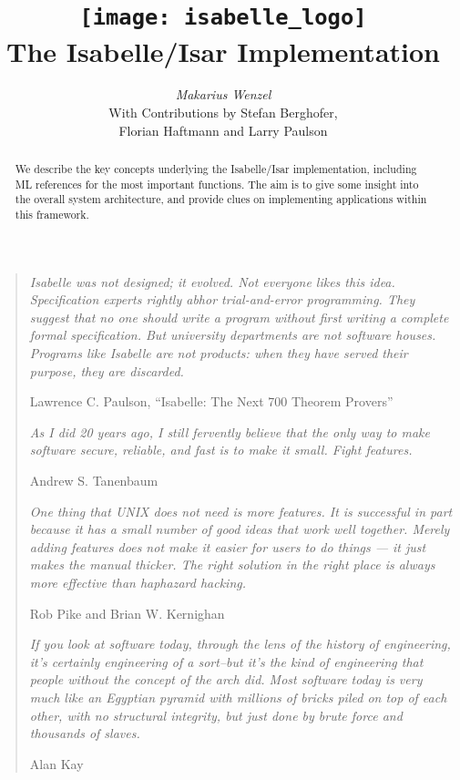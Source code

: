\documentclass[12pt,a4paper,fleqn]{report}
\title{\texttt{[image: isabelle\_logo]}
  \\[4ex] The Isabelle/Isar Implementation}
\author{\emph{Makarius Wenzel}  \\[3ex]
  With Contributions by
  Stefan Berghofer, \\
  Florian Haftmann
  and Larry Paulson
}
\begin{document}
\maketitle

\begin{abstract}
  We describe the key concepts underlying the Isabelle/Isar
  implementation, including ML references for the most important
  functions.  The aim is to give some insight into the overall system
  architecture, and provide clues on implementing applications within
  this framework.
\end{abstract}

\vspace*{2.5cm}
\begin{quote}

  {\small\em Isabelle was not designed; it evolved.  Not everyone
    likes this idea.  Specification experts rightly abhor
    trial-and-error programming.  They suggest that no one should
    write a program without first writing a complete formal
    specification. But university departments are not software houses.
    Programs like Isabelle are not products: when they have served
    their purpose, they are discarded.}

  Lawrence C. Paulson, ``Isabelle: The Next 700 Theorem Provers''

  \vspace*{1cm}

  {\small\em As I did 20 years ago, I still fervently believe that the
    only way to make software secure, reliable, and fast is to make it
    small.  Fight features.}

  Andrew S. Tanenbaum

  \vspace*{1cm}

  {\small\em One thing that UNIX does not need is more features. It is
    successful in part because it has a small number of good ideas
    that work well together. Merely adding features does not make it
    easier for users to do things --- it just makes the manual
    thicker. The right solution in the right place is always more
    effective than haphazard hacking.}

  Rob Pike and Brian W. Kernighan

  \vspace*{1cm}

  {\small\em If you look at software today, through the lens of the
    history of engineering, it's certainly engineering of a sort--but
    it's the kind of engineering that people without the concept of
    the arch did. Most software today is very much like an Egyptian
    pyramid with millions of bricks piled on top of each other, with
    no structural integrity, but just done by brute force and
    thousands of slaves.}

  Alan Kay

\end{quote}
\end{document}
